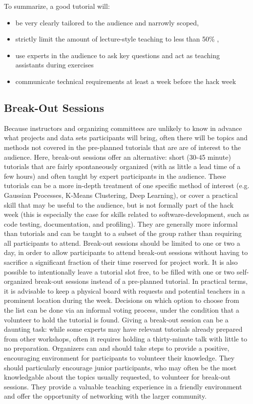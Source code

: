 \documentclass{aastex62}
\begin{document}
To summarize, a good tutorial will:
\begin{itemize}
\item be very clearly tailored to the audience and narrowly scoped,
\item strictly limit the amount of lecture-style teaching to less than 50\% ,
\item use experts in the audience to ask key questions and act as teaching assistants during exercises
\item communicate technical requirements at least a week before the hack week
\end{itemize}

\subsection{Break-Out Sessions}

Because instructors and organizing committees are unlikely to know in advance what projects and data sets participants will bring, often there will be topics and methods not covered in the pre-planned tutorials that are are of interest to the audience. Here, break-out sessions offer an alternative: short (30-45 minute) tutorials that are fairly spontaneously organized (with as little a lead time of a few hours) and often taught by expert participants in the audience. These tutorials can be a more in-depth treatment of one specific method of interest (e.g. Gaussian Processes, K-Means Clustering, Deep Learning), or cover a practical skill that may be useful to the audience, but is not formally part of the hack week (this is especially the case for skills related to software-development, such as code testing, documentation, and profiling). They are generally more informal than tutorials and can be taught to a subset of the group rather than requiring all participants to attend.
Break-out sessions should be limited to one or two a day, in order to allow participants to attend break-out sessions without having to sacrifice a significant fraction of their time reserved for project work. It is also possible to intentionally leave a tutorial slot free, to be filled with one or two self-organized break-out sessions instead of a pre-planned tutorial. In practical terms, it is advisable to keep a physical board with requests and potential teachers in a prominent location during the week. Decisions on which option to choose from the list can be done via an informal voting process, under the condition that a volunteer to hold the tutorial is found. Giving a break-out session can be a daunting task: while some experts may have relevant tutorials already prepared from other workshops, often it requires holding a thirty-minute talk with little to no preparation. Organizers can and should take steps to provide a positive, encouraging environment for participants to volunteer their knowledge. They should particularly encourage junior participants, who may often be the most knowledgable about the topics usually requested, to volunteer for break-out sessions. They provide a valuable teaching experience in a friendly environment and offer the opportunity of networking with the larger community.
\end{document}
